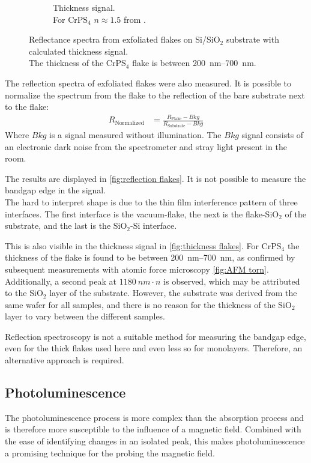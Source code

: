 \documentclass[
	twoside,
	parskip=half,
	a4paper,
]{scrbook}
\begin{document}
\begin{figure}
\begin{subfigure}[c]{2in}
		\caption{Thickness signal.\\ For CrPS$_4$  $n\approx1.5$ from \cite{CrPS4_refrative}. }
		\label{fig:thickness flakes}
	\end{subfigure}
	\caption{Reflectance spectra from exfoliated flakes on Si/SiO$_2$ substrate with calculated thickness signal.\\ The thickness of the CrPS$_4$ flake is between \SIrange{200}{700}{nm}.}
\end{figure}
The reflection spectra of exfoliated flakes were also measured.
It is possible to normalize the spectrum from the flake to the reflection of the bare substrate next to the flake:
\begin{align}
	R_\text{Normalized} &= \frac{R_\text{Flake} - Bkg}{R_\text{Substrate} - Bkg}
\end{align}
Where $Bkg$ is a signal measured without illumination. 
The $Bkg$ signal consists of an electronic dark noise from the spectrometer and stray light present in the room.

The results are displayed in \autoref{fig:reflection flakes}.
It is not possible to measure the bandgap edge in the signal.\\
The hard to interpret shape is due to the thin film interference pattern of three interfaces.
The first interface is the vacuum-flake, the next is the flake-SiO$_2$ of the substrate, and the last is the SiO$_2$-Si interface.

This is also visible in the thickness signal in \autoref{fig:thickness flakes}.
For CrPS$_4$ the thickness of the flake is found to be between \SIrange{200}{700}{nm}, as confirmed by subsequent measurements with atomic force microscopy \autoref{fig:AFM torn}.\\
Additionally, a second peak at $\SI{1180}{nm}\cdot n$ is observed, which may be attributed to the SiO$_2$ layer of the substrate. 
However, the substrate was derived from the same wafer for all samples, and there is no reason for the thickness of the SiO$_2$ layer to vary between the different samples.

Reflection spectroscopy is not a suitable method for measuring the bandgap edge, even for the thick flakes used here and even less so for monolayers. 
Therefore, an alternative approach is required.

\subsection{Photoluminescence}
The photoluminescence process is more complex than the absorption process and is therefore more susceptible to the influence of a magnetic field. 
Combined with the ease of identifying changes in an isolated peak, this makes photoluminescence a promising technique for the probing the magnetic field.
\end{document}
